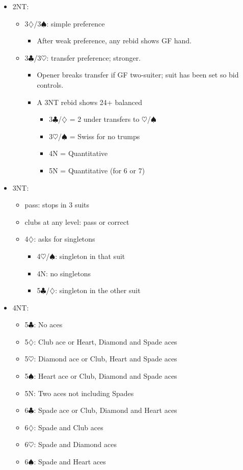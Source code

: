 \documentclass[a4paper,12pt]{article}
\begin{document}
\begin{itemize}
\item 2NT:
	\begin{itemize}
   \item 3$\diamondsuit$/3$\spadesuit$: simple preference
		\begin{itemize}
      \item After weak preference, any rebid shows GF hand.
		\end{itemize}
   \item 3$\clubsuit$/3$\heartsuit$: transfer preference; stronger.
		\begin{itemize}
      \item Opener breaks transfer if GF two-suiter; suit has been set so bid controls.
      \item A 3NT rebid shows 24+ balanced
			\begin{itemize}
         \item 3$\clubsuit$/$\diamondsuit$ = 2 under transfers to $\heartsuit$/$\spadesuit$
         \item 3$\heartsuit$/$\spadesuit$ = Swiss for no trumps
         \item 4N = Quantitative
         \item 5N = Quantitative (for 6 or 7)
			\end{itemize}
		\end{itemize}
	\end{itemize}

\item 3NT:
	\begin{itemize}
	\item pass: stops in 3 suits
	\item clubs at any level: pass or correct
	\item 4$\diamondsuit$: asks for singletons
		\begin{itemize}
		\item 4$\heartsuit$/$\spadesuit$: singleton in that suit
		\item 4N: no singletons
		\item 5$\clubsuit$/$\diamondsuit$: singleton in the other suit
		\end{itemize}
	\end{itemize}

\item 4NT:
	\begin{itemize}
	\item 5$\clubsuit$: No aces
	\item 5$\diamondsuit$: Club ace or Heart, Diamond and Spade aces
	\item 5$\heartsuit$: Diamond ace or Club, Heart and Spade aces
	\item 5$\spadesuit$: Heart ace or Club, Diamond and Spade aces
	\item 5N: Two aces not including Spades
	\item 6$\clubsuit$: Spade ace or Club, Diamond and Heart aces
	\item 6$\diamondsuit$: Spade and Club aces
	\item 6$\heartsuit$: Spade and Diamond aces
	\item 6$\spadesuit$: Spade and Heart aces
	\end{itemize}


\end{itemize}
\end{document}
